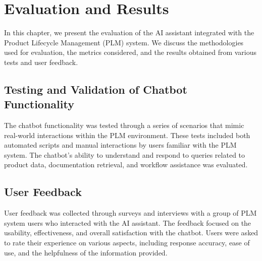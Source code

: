 \chapter{Evaluation and Results}
\label{ch:evaluation-and-results}

In this chapter, we present the evaluation of the AI assistant integrated with the Product Lifecycle Management (PLM) system. We discuss the methodologies used for evaluation, the metrics considered, and the results obtained from various tests and user feedback.

\section{Testing and Validation of Chatbot Functionality}
\label{sec:testing-and-validation-of-chatbot-functionality}

The chatbot functionality was tested through a series of scenarios that mimic real-world interactions within the PLM environment. These tests included both automated scripts and manual interactions by users familiar with the PLM system. The chatbot's ability to understand and respond to queries related to product data, documentation retrieval, and workflow assistance was evaluated.

\section{User Feedback}
\label{sec:user-feedback}

User feedback was collected through surveys and interviews with a group of PLM system users who interacted with the AI assistant. The feedback focused on the usability, effectiveness, and overall satisfaction with the chatbot. Users were asked to rate their experience on various aspects, including response accuracy, ease of use, and the helpfulness of the information provided.
